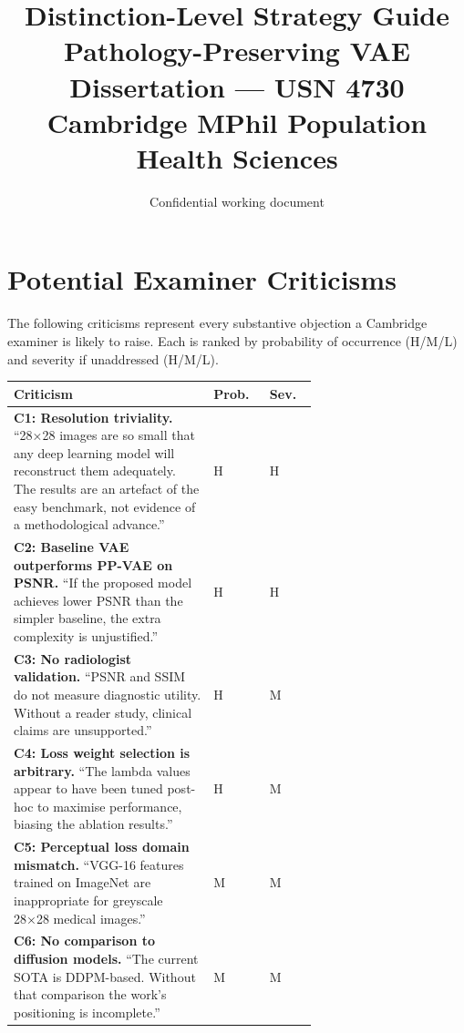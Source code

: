 \documentclass[12pt, a4paper]{article}
\title{\textbf{\color{darkblue}Distinction-Level Strategy Guide}\\
\large Pathology-Preserving VAE Dissertation — USN 4730\\
Cambridge MPhil Population Health Sciences}
\date{Confidential working document}
\begin{document}
\maketitle
\tableofcontents
\newpage

\section{Potential Examiner Criticisms}

\noindent The following criticisms represent every substantive objection
a Cambridge examiner is likely to raise. Each is ranked by probability
of occurrence (H/M/L) and severity if unaddressed (H/M/L).

\begin{longtable}{p{0.5\linewidth} p{0.08\linewidth} p{0.08\linewidth}}
\toprule
\textbf{Criticism} & \textbf{Prob.} & \textbf{Sev.} \\
\midrule
\endhead

\textbf{C1: Resolution triviality.}
``28×28 images are so small that any deep learning model
will reconstruct them adequately. The results are an artefact
of the easy benchmark, not evidence of a methodological advance.''
& H & H \\

\addlinespace
\textbf{C2: Baseline VAE outperforms PP-VAE on PSNR.}
``If the proposed model achieves lower PSNR than the simpler
baseline, the extra complexity is unjustified.''
& H & H \\

\addlinespace
\textbf{C3: No radiologist validation.}
``PSNR and SSIM do not measure diagnostic utility. Without a
reader study, clinical claims are unsupported.''
& H & M \\

\addlinespace
\textbf{C4: Loss weight selection is arbitrary.}
``The lambda values appear to have been tuned post-hoc to
maximise performance, biasing the ablation results.''
& H & M \\

\addlinespace
\textbf{C5: Perceptual loss domain mismatch.}
``VGG-16 features trained on ImageNet are inappropriate
for greyscale 28×28 medical images.''
& M & M \\

\addlinespace
\textbf{C6: No comparison to diffusion models.}
``The current SOTA is DDPM-based. Without that comparison
the work's positioning is incomplete.''
& M & M \\


\end{longtable}
\end{document}
